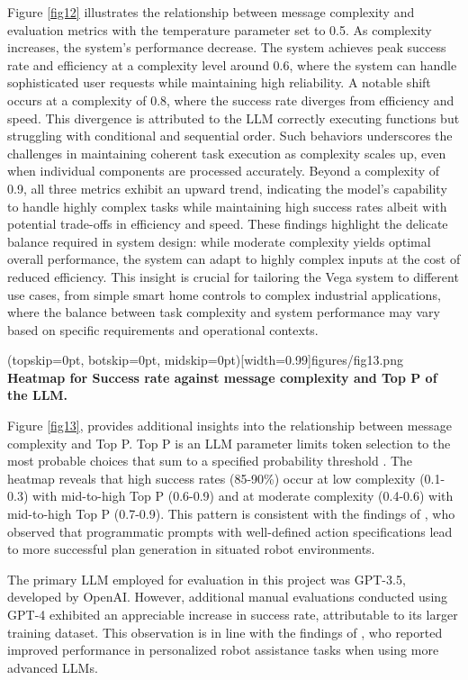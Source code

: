 \documentclass{ieeeaccess}
\begin{document}
Figure \ref{fig12} illustrates the relationship between message complexity and evaluation metrics with the temperature parameter set to 0.5. As complexity increases, the system's performance decrease. The system achieves peak success rate and efficiency at a complexity level around 0.6, where the system can handle sophisticated user requests while maintaining high reliability. A notable shift occurs at a complexity of 0.8, where the success rate diverges from efficiency and speed. This divergence is attributed to the LLM correctly executing functions but struggling with conditional and sequential order. Such behaviors underscores the challenges in maintaining coherent task execution as complexity scales up, even when individual components are processed accurately. Beyond a complexity of 0.9, all three metrics exhibit an upward trend, indicating the model's capability to handle highly complex tasks while maintaining high success rates albeit with potential trade-offs in efficiency and speed. These findings highlight the delicate balance required in system design: while moderate complexity yields optimal overall performance, the system can adapt to highly complex inputs at the cost of reduced efficiency. This insight is crucial for tailoring the Vega system to different use cases, from simple smart home controls to complex industrial applications, where the balance between task complexity and system performance may vary based on specific requirements and operational contexts. 

\Figure[h!](topskip=0pt, botskip=0pt,
midskip=0pt)[width=0.99\columnwidth]{{figures/fig13.png}}
{ \textbf{Heatmap for Success rate against message complexity and Top P of the LLM.}\label{fig13}}

Figure \ref{fig13}, provides additional insights into the relationship between message complexity and Top P. Top P is an LLM parameter limits token selection to the most probable choices that sum to a specified probability threshold \cite{rum2024setting}. The heatmap reveals that high success rates (85-90\%) occur at low complexity (0.1-0.3) with mid-to-high Top P (0.6-0.9) and at moderate complexity (0.4-0.6) with mid-to-high Top P (0.7-0.9). This pattern is consistent with the findings of \citet{Singh2023}, who observed that programmatic prompts with well-defined action specifications lead to more successful plan generation in situated robot environments.

The primary LLM employed for evaluation in this project was GPT-3.5, developed by OpenAI. However, additional manual evaluations conducted using GPT-4 exhibited an appreciable increase in success rate, attributable to its larger training dataset. This observation is in line with the findings of \citet{Wu2023}, who reported improved performance in personalized robot assistance tasks when using more advanced LLMs.
\end{document}
